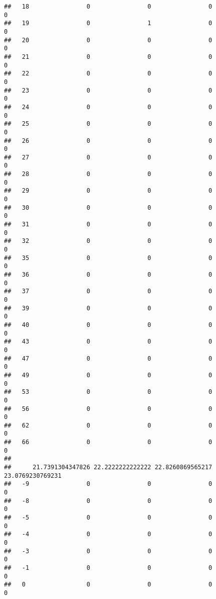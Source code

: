 \documentclass[]{article}
\begin{document}
\begin{verbatim}
##   18                0                0                0                0
##   19                0                1                0                0
##   20                0                0                0                0
##   21                0                0                0                0
##   22                0                0                0                0
##   23                0                0                0                0
##   24                0                0                0                0
##   25                0                0                0                0
##   26                0                0                0                0
##   27                0                0                0                0
##   28                0                0                0                0
##   29                0                0                0                0
##   30                0                0                0                0
##   31                0                0                0                0
##   32                0                0                0                0
##   35                0                0                0                0
##   36                0                0                0                0
##   37                0                0                0                0
##   39                0                0                0                0
##   40                0                0                0                0
##   43                0                0                0                0
##   47                0                0                0                0
##   49                0                0                0                0
##   53                0                0                0                0
##   56                0                0                0                0
##   62                0                0                0                0
##   66                0                0                0                0
##     
##      21.7391304347826 22.2222222222222 22.8260869565217 23.0769230769231
##   -9                0                0                0                0
##   -8                0                0                0                0
##   -5                0                0                0                0
##   -4                0                0                0                0
##   -3                0                0                0                0
##   -1                0                0                0                0
##   0                 0                0                0                0

\end{verbatim}
\end{document}

